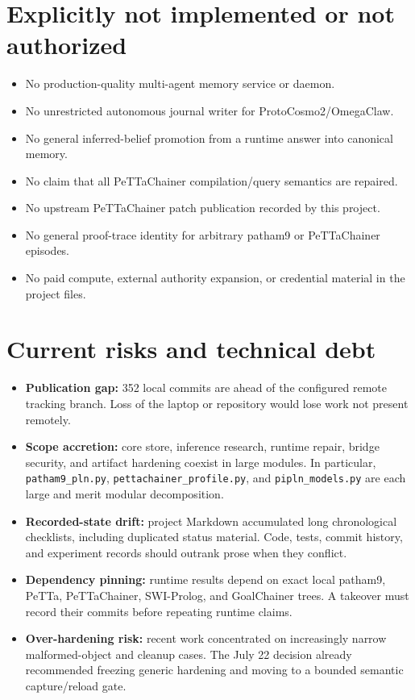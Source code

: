 \documentclass[11pt]{article}
\begin{document}
\section{Explicitly not implemented or not authorized}

\begin{itemize}
\item No production-quality multi-agent memory service or daemon.
\item No unrestricted autonomous journal writer for ProtoCosmo2/OmegaClaw.
\item No general inferred-belief promotion from a runtime answer into canonical
memory.
\item No claim that all PeTTaChainer compilation/query semantics are repaired.
\item No upstream PeTTaChainer patch publication recorded by this project.
\item No general proof-trace identity for arbitrary patham9 or PeTTaChainer
episodes.
\item No paid compute, external authority expansion, or credential material in
the project files.
\end{itemize}

\section{Current risks and technical debt}

\begin{itemize}
\item \textbf{Publication gap:} 352 local commits are ahead of the configured
remote tracking branch.  Loss of the laptop or repository would lose work not
present remotely.
\item \textbf{Scope accretion:} core store, inference research, runtime repair,
bridge security, and artifact hardening coexist in large modules.  In
particular, \texttt{patham9\_pln.py}, \texttt{pettachainer\_profile.py}, and
\texttt{pipln\_models.py} are each large and merit modular decomposition.
\item \textbf{Recorded-state drift:} project Markdown accumulated long
chronological checklists, including duplicated status material.  Code, tests,
commit history, and experiment records should outrank prose when they conflict.
\item \textbf{Dependency pinning:} runtime results depend on exact local
patham9, PeTTa, PeTTaChainer, SWI-Prolog, and GoalChainer trees.  A takeover must
record their commits before repeating runtime claims.
\item \textbf{Over-hardening risk:} recent work concentrated on increasingly
narrow malformed-object and cleanup cases.  The July 22 decision already
recommended freezing generic hardening and moving to a bounded semantic
capture/reload gate.
\end{itemize}
\end{document}
